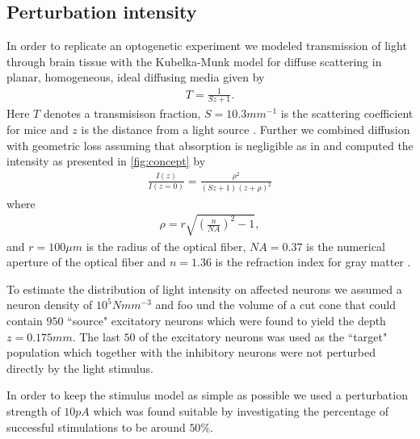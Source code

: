 \documentclass[11pt]{article}
\begin{document}
\subsection{Perturbation intensity}
In order to replicate an optogenetic experiment we modeled transmission of light through brain tissue with the Kubelka-Munk model for diffuse scattering in planar, homogeneous, ideal diffusing media given by
\begin{align}
T = \frac{1}{Sz + 1}.
\end{align}
Here $ T $ denotes a transmisison fraction, $ S = 10.3 mm^{-1} $ is the scattering coefficient for mice \cite{Aravanis2007} and $ z $ is the distance from a light source \cite{Ho2017}. Further we combined diffusion with geometric loss assuming that absorption is negligible as in \cite{Aravanis2007} and computed the intensity as presented in \cref{fig:concept} by
\begin{align}
\frac{I(z)}{I(z=0)} = \frac{\rho^2}{(Sz + 1)(z + \rho)^2}
\end{align}
where
\begin{align}
\rho = r\sqrt{\left(\frac{n}{NA}\right)^2 - 1},
\end{align}
and $ r = 100\mu m $ is the radius of the optical fiber, $ NA = 0.37 $ is the numerical aperture of the optical fiber and $ n = 1.36 $ is the refraction index for gray matter \cite{Ho2017}.

To estimate the distribution of light intensity on affected neurons we assumed a neuron density of $ 10^5 Nmm^{-3} $ and foo und the volume of a cut cone that could contain $ 950 $ ``source" excitatory neurons which were found to yield the depth $ z = 0.175 mm $. The last $ 50 $ of the excitatory neurons was used as the ``target" population which together with the inhibitory neurons were not perturbed directly by the light stimulus.

In order to keep the stimulus model as simple as possible we used a perturbation strength of $ 10 pA $ which was found suitable by investigating the percentage of successful stimulations to be around $ 50\% $.

\pagestyle{empty}

{\footnotesize\linespread{1}
}
\newpage
\listoftodos
\end{document}
